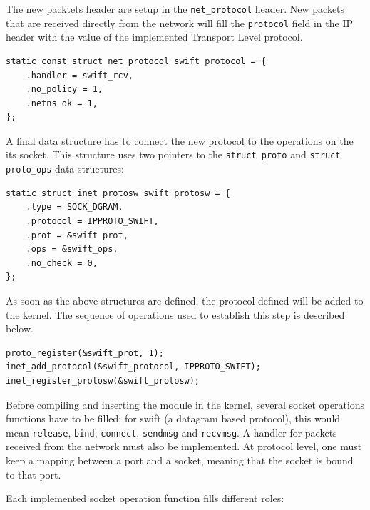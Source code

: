 The new packtets header are setup in the \texttt{net\_protocol} header. New
packets that are received directly from the network will fill the
\texttt{protocol} field in the IP header with the value of the implemented
Transport Level protocol.
\begin{verbatim}
static const struct net_protocol swift_protocol = {
    .handler = swift_rcv,
    .no_policy = 1,
    .netns_ok = 1,
};
\end{verbatim}

A final data structure has to connect the new protocol to the operations on
the its socket. This structure uses two pointers to the \texttt{struct proto}
and \texttt{struct proto\_ops} data structures:
\begin{verbatim}
static struct inet_protosw swift_protosw = {
    .type = SOCK_DGRAM,
    .protocol = IPPROTO_SWIFT,
    .prot = &swift_prot,
    .ops = &swift_ops,
    .no_check = 0,
};
\end{verbatim}

As soon as the above structures are defined, the protocol defined will be
added to the kernel. The sequence of operations used to establish this step is
described below.

\begin{verbatim}
proto_register(&swift_prot, 1);
inet_add_protocol(&swift_protocol, IPPROTO_SWIFT);
inet_register_protosw(&swift_protosw);
\end{verbatim}

Before compiling and inserting the module in the kernel, several socket
operations functions have to be filled; for swift (a datagram based protocol),
this would mean \texttt{release}, \texttt{bind}, \texttt{connect},
\texttt{sendmsg} and \texttt{recvmsg}. A handler for packets received from the
network must also be implemented. At protocol level, one must keep a mapping
between a port and a socket, meaning that the socket is bound to that port.

Each implemented socket operation function fills different roles:

